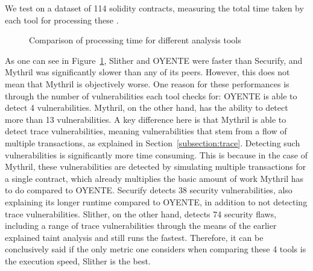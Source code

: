 \documentclass[letterpaper,twocolumn,10pt]{article}
\begin{document}
We test on a dataset of 114 solidity contracts, measuring the total time taken by each tool for processing these \cite{data}. 
\begin{figure}
\centering

\caption{Comparison of processing time for different analysis tools\label{perf:speed}}
\end{figure}



As one can see in Figure~\ref{perf:speed}, Slither and OYENTE were faster than Securify, and Mythril was significantly slower than any of its peers. However, this does not mean that Mythril is objectively worse. One reason for these performances is through the number of vulnerabilities each tool checks for: OYENTE is able to detect 4 vulnerabilities. Mythril, on the other hand, has the ability to detect more than 13 vulnerabilities. A key difference here is that Mythril is able to detect trace vulnerabilities, meaning vulnerabilities that stem from a flow of multiple transactions, as explained in Section~\ref{subsection:trace}. Detecting such vulnerabilities is significantly more time consuming. This is because in the case of Mythril, these vulnerabilities are detected by simulating multiple transactions for a single contract, which already multiplies the basic amount of work Mythril has to do compared to OYENTE. Securify detects 38 security vulnerabilities, also explaining its longer runtime compared to OYENTE, in addition to not detecting trace vulnerabilities. Slither, on the other hand, detects 74 security flaws, including a range of trace vulnerabilities through the means of the earlier explained taint analysis and still runs the fastest. Therefore, it can be conclusively said if the only metric one considers when comparing these 4 tools is the execution speed, Slither is the best.
\end{document}
